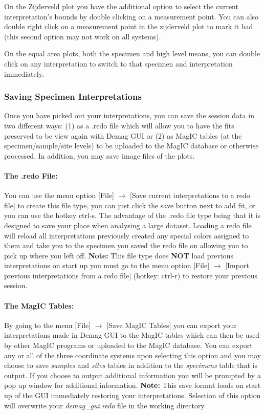 \documentclass[11pt]{book}
\begin{document}
{{\noindent On the Zijderveld plot you have the additional option to select the current interpretation's bounds by double clicking on a measurement point. You can also double right click on a measurement point in the zijderveld plot to mark it bad (this second option may not work on all systems).

\noindent On the equal area plots, both the specimen and high level means, you can double click on any interpretation to switch to that specimen and interpretation immediately.

\subsubsection{Saving Specimen Interpretations}\label{saving-specimen-interpretations}

Once you have picked out your interpretations, you can save the session data in two different ways: (1) as a .redo file which will allow you to have the fits preserved to be view again with Demag GUI or (2) as MagIC tables (at the specimen/sample/site levels) to be uploaded to the MagIC database or otherwise processed. In addition, you may save image files of the plots.

\paragraph{The .redo File:}\label{the-.redo-file} You can use the menu option [File] $\rightarrow$ [Save current interpretations to a redo file] to create this file type, you can just click the save button next to add fit, or you can use the hotkey ctrl-s. The advantage of the .redo file type being that it is designed to save your place when analysing a large dataset. Loading a redo file will reload all interpretations previously created any special colors assigned to them and take you to the specimen you saved the redo file on allowing you to pick up where you left off. \textbf{Note:} This file type does \textbf{NOT} load previous interpretations on start up you must go to the menu option [File] $\rightarrow$ [Import previous interpretations from a redo file] (hotkey: ctrl-r) to restore your previous session.

\paragraph{The MagIC Tables:}\label{the-pmag-tables} By going to the menu [File] $\rightarrow$ [Save MagIC Tables] you can export your interpretations made in Demag GUI to the MagIC tables which can then be used by other MagIC programs or uploaded to the MagIC database. You can export any or all of the three coordinate systems upon selecting this option and you may choose to save {\it samples} and {\it sites}  tables in addition to the {\it specimens } table that is output. If you choose to output additional information you will be prompted by a pop up window for additional information. \textbf{Note:} This save format loads on start up of the GUI immediately restoring your interpretations. Selection of this option will overwrite your {\it demag\_gui.redo} file in the working directory.

}}
\end{document}
